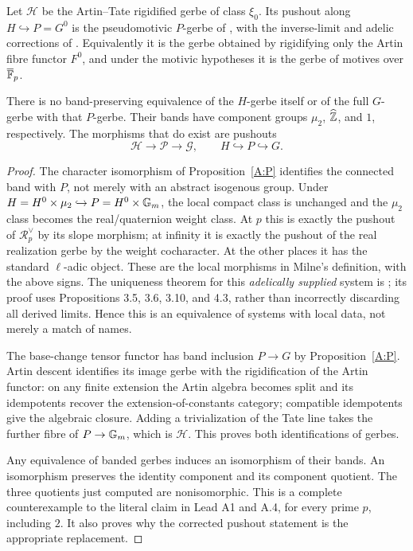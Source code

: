 \begin{theorem}
\label{A:comparison}
Let $\mathscr H$ be the Artin--Tate rigidified gerbe of class
$\xi_0$. Its pushout along $H\hookrightarrow P=G^0$ is the
pseudomotivic $P$-gerbe of
\citet[Theorem 3.29 and Theorem 3.31]{AMilne1994}, with the
inverse-limit and adelic corrections of
\citet[Theorem 6.3 and Definition 6.6]{AMilne2003}.
Equivalently it is the gerbe obtained by rigidifying only the
Artin fibre functor $F^0$, and under the motivic hypotheses it
is the gerbe of motives over $\overline{\mathbb F}_p$.

There is no band-preserving equivalence of the $H$-gerbe itself
or of the full $G$-gerbe with that $P$-gerbe. Their bands have
component groups $\mu_2$, $\widehat{\mathbb Z}$, and $1$, respectively.
The morphisms that do exist are pushouts
\[
 \mathscr H\longrightarrow\mathscr P
       \longrightarrow\mathscr G,
 \qquad H\hookrightarrow P\hookrightarrow G.
\]
\end{theorem}
\begin{proof}
The character isomorphism of Proposition~\ref{A:P} identifies the
connected band with $P$, not merely with an abstract isogenous
group. Under $H=H^0\times\mu_2\hookrightarrow
P=H^0\times{\mathbb G_m}$, the local compact class is unchanged and the
$\mu_2$ class becomes the real/quaternion weight class.
At $p$ this is exactly the pushout of $\mathcal R_p^\vee$ by
its slope morphism; at infinity it is exactly the pushout of the
real realization gerbe by the weight cocharacter. At the other
places it has the standard \(\ell\)-adic object. These are the
local morphisms in Milne's definition, with the above signs.
The uniqueness theorem for this \emph{adelically supplied} system
is \citet[Theorem 6.3]{AMilne2003}; its proof uses
Propositions 3.5, 3.6, 3.10, and 4.3, rather than incorrectly
discarding all derived limits. Hence this is an equivalence of
systems with local data, not merely a match of names.

The base-change tensor functor has band inclusion $P\to G$ by
Proposition~\ref{A:P}. Artin descent identifies its image gerbe
with the rigidification of the Artin functor: on any finite
extension the Artin algebra becomes split and its idempotents
recover the extension-of-constants category; compatible
idempotents give the algebraic closure. Adding a trivialization
of the Tate line takes the further fibre of $P\to{\mathbb G_m}$, which
is $\mathscr H$. This proves both identifications of gerbes.

Any equivalence of banded gerbes induces an isomorphism of their
bands. An isomorphism preserves the identity component and its
component quotient. The three quotients just computed are
nonisomorphic. This is a complete counterexample to the literal
claim in Lead A1 and A.4, for every prime $p$, including $2$.
It also proves why the corrected pushout statement is the
appropriate replacement.
\end{proof}

